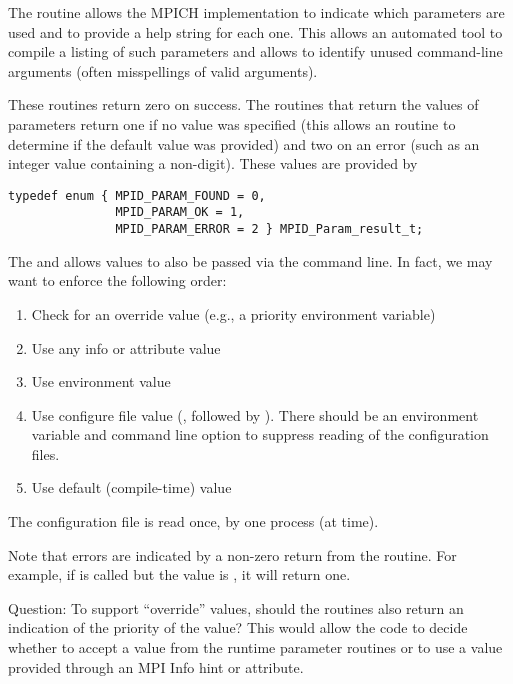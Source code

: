 \documentclass{article}
\begin{document}
The routine  allows the MPICH implementation to
indicate which parameters are used and to provide a help string for each one.
This allows an automated tool to compile a listing of such parameters and
allows  to identify unused command-line arguments
(often misspellings of valid arguments).

These routines return zero on success.  The routines that return the values of
parameters return one if no value was specified (this allows an routine to
determine if the default value was provided) and two on an error (such as an
integer value containing a non-digit).  These values are provided by
\begin{verbatim}
typedef enum { MPID_PARAM_FOUND = 0, 
               MPID_PARAM_OK = 1, 
               MPID_PARAM_ERROR = 2 } MPID_Param_result_t;
\end{verbatim}

The  and  allows
values to also be passed via the command line.  
In fact, we may want to enforce the following order:
\begin{enumerate}
\item Check for an override value (e.g., a priority environment variable)
\item Use any info or attribute value
\item Use environment value
\item Use configure file value (, followed by
  ).  There should be an environment variable and command
  line option to suppress reading of the configuration files.
\item Use default (compile-time) value
\end{enumerate}
The configuration file is read once, by one process (at
 time).  

Note that errors are indicated by a non-zero return from the routine.
For example, if  is called but the value
is , it will return one.

Question: To support ``override'' values, should the routines also
return an indication of the priority of the value?  This would allow
the code to decide whether to accept a value from the runtime
parameter routines or to use a value provided through an MPI Info hint
or attribute.
\end{document}
